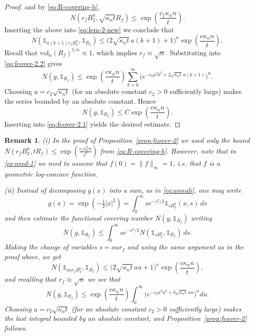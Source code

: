\documentclass[11pt,leqno]{article}
\newtheorem{remark}[theorem]{Remark}
\theoremstyle{definition}
\theoremstyle{remark}
\numberwithin{equation}{section}
\newcommand{\vol}{\mathrm{vol}}
\newcommand{\ls}{\leqslant}
\begin{document}
\begin{proof}
and by \eqref{eq:R-covering-b},
$$N(r_f B_2^n,\sqrt{\kappa_nt}R_f)\ls \exp\!\left(\frac{c_1\kappa_nn}{t}\right).$$
Inserting the above into \eqref{eq:lem-2-new} we conclude that
$$N(\mathds{1}_{a(k+1)r_f B_2^n},\mathds{1}_{R_f})\ls \bigl(2\sqrt{\kappa_nt}\,a(k+1)+1\bigr)^n
\exp\!\left(\frac{c\kappa_n n}{t}\right),$$
Recall that $\vol_n(R_f)^{1/n}\approx 1$, which implies $r_f\approx\sqrt{n}$. Substituting into \eqref{eq:fcover-2.2} gives
$$N(g,\mathds{1}_{R_f})\ls \exp\!\left(\frac{c\kappa_n n}{t}\right)
\sum_{k=0}^{\infty}\bigl(e^{-c_0 a^2 k^2 + 2\sqrt{\kappa_nt}\,a(k+1)}\bigr)^{n}.$$
Choosing $a=c_2\sqrt{\kappa_nt}$ (for an absolute constant $c_2>0$ sufficiently large) makes the series bounded by an
absolute constant. Hence
$$N(g,\mathds{1}_{R_f})\ls C \exp\!\left(\frac{c\kappa_n n}{t}\right).$$
Inserting into \eqref{eq:fcover-2.1} yields the desired estimate.
\end{proof}

\begin{remark}\label{rem:fcover-2}\rm (i) In the proof of Proposition~\ref{prop:fcover-2} we used only the bound
$N(r_f B_2^n, t R_f)\ls \exp\left( \tfrac{c_1 \kappa_n^2 n}{t^2}\right)$ from \eqref{eq:R-covering-b}.
However, note that in \eqref{eq:need-1} we need to assume that $f(0)=\|f\|_{\infty}=1$, i.e. that $f$ is a geometric
log-concave function.

\smallskip 

(ii) Instead of decomposing $g(x)$ into a sum, as in \eqref{eq:annuli}, one may write
$$g(x)=\exp\left(-\tfrac{1}{2}|x|^2\right)=\int_0^{\infty}se^{-s^2/2}\mathds{1}_{sB_2^n}(x,s)\,ds$$
and then estimate the functional covering number $N(g,\mathds{1}_{R_f})$ writing
$$N(g,\mathds{1}_{R_f})\ls \int_0^{\infty}se^{-s^2/2}N(\mathds{1}_{sB_2^n},\mathds{1}_{R_f})\,ds.$$
Making the change of variables $s=aur_f$ and using the same argument as in the proof above, we get
$$N(\mathds{1}_{aur_f B_2^n},\mathds{1}_{R_f})\ls \bigl(2\sqrt{\kappa_nt}\,au+1\bigr)^n
\exp\!\left(\frac{c\kappa_n n}{t}\right),$$
and recalling that $r_f\approx\sqrt{n}$ we see that
$$N(g,\mathds{1}_{R_f})\ls \exp\!\left(\frac{c\kappa_n n}{t}\right)
\int_0^{\infty}\bigl(e^{-c_0 a^2u^2 + 3\sqrt{\kappa_nt}\,au}\bigr)^{n}du.$$
Choosing $a=c_2\sqrt{\kappa_nt}$ (for an absolute constant $c_2>0$ sufficiently large) makes 
the last integral bounded by an absolute constant, and Proposition~\ref{prop:fcover-2} follows.
\end{remark}
\end{document}
